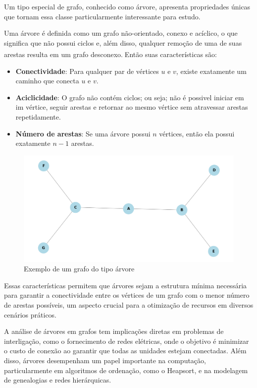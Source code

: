 \documentclass[12pt, a4paper]{scrreprt}
\begin{document}
Um tipo especial de grafo, conhecido como árvore, apresenta propriedades únicas que tornam essa classe particularmente interessante para estudo.

Uma árvore é definida como um grafo não-orientado, conexo e acíclico, o que significa que não possui ciclos e, além disso, qualquer remoção de uma de suas arestas resulta em um grafo desconexo.\textsuperscript{\cite{definicaoarvore} \cite{emilio2024arvores}} Então suas características são:

\begin{itemize}
        \item \textbf{Conectividade}: Para qualquer par de vértices \( u \) e \( v \), existe exatamente um caminho que conecta \( u \) e \( v \).
        \item \textbf{Aciclicidade}: O grafo não contém ciclos; ou seja; não é possivel iniciar em im vértice, seguir arestas e retornar ao mesmo vértice sem atravessar arestas repetidamente.
        \item \textbf{Número de arestas}: Se uma árvore possui \( n \) vértices, então ela possui exatamente \( n - 1 \) arestas.
\end{itemize}

\begin{figure}[h]
    \centering
    \includegraphics[width=.65\textwidth]{src/arvore_exemplo.png}
    \caption{Exemplo de um grafo do tipo árvore}
    \label{fig:exemplo de árvore}
\end{figure}

Essas características permitem que árvores sejam a estrutura mínima necessária para garantir a conectividade entre os vértices de um grafo com o menor número de arestas possíveis, um aspecto crucial para a otimização de recursos em diversos cenários práticos.

A análise de árvores em grafos tem implicações diretas em problemas de interligação, como o fornecimento de redes elétricas, onde o objetivo é minimizar o custo de conexão ao garantir que todas as unidades estejam conectadas. Além disso, árvores desempenham um papel importante na computação, particularmente em algoritmos de ordenação, como o Heapsort, e na modelagem de genealogias e redes hierárquicas.
\end{document}
